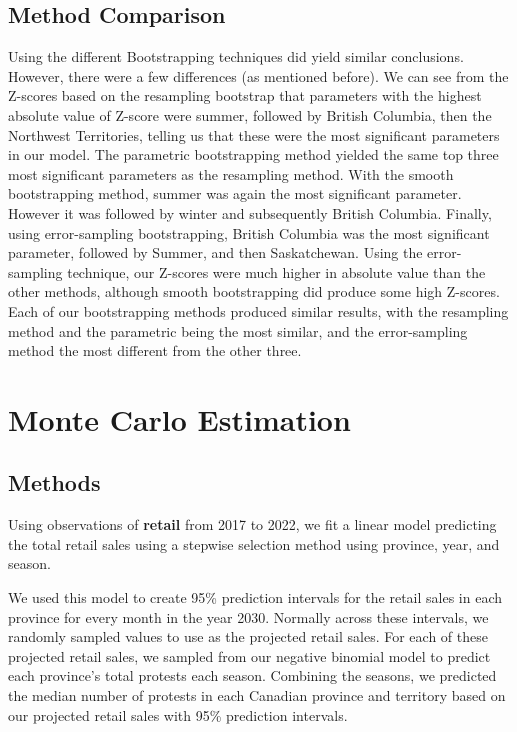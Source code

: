 \documentclass[12pt]{article}
\begin{document}


\subsection{Method Comparison}
Using the different Bootstrapping techniques did yield similar conclusions. However, there were a few differences (as mentioned before). We can see from the Z-scores based on the resampling bootstrap that parameters with the highest absolute value of Z-score were summer, followed by British Columbia, then the Northwest Territories, telling us that these were the most significant parameters in our model. The parametric bootstrapping method yielded the same top three most significant parameters as the resampling method. With the smooth bootstrapping method, summer was again the most significant parameter. However it was followed by winter and subsequently British Columbia. Finally, using error-sampling bootstrapping, British Columbia was the most significant parameter, followed by Summer, and then Saskatchewan. Using the error-sampling technique, our Z-scores were much higher in absolute value than the other methods, although smooth bootstrapping did produce some high Z-scores.
Each of our bootstrapping methods produced similar results, with the resampling method and the parametric being the most similar, and the error-sampling method the most different from the other three.

\newpage
\section{Monte Carlo Estimation}
\subsection*{Methods}
Using observations of \textbf{retail} from 2017 to 2022, we fit a linear model predicting the total retail sales using a stepwise selection method using province, year, and season.

We used this model to create 95\% prediction intervals for the retail sales in each province for every month in the year 2030. Normally across these intervals, we randomly sampled values to use as the projected retail sales. For each of these projected retail sales, we sampled from our negative binomial model to predict each province's total protests each season. Combining the seasons, we predicted the median number of protests in each Canadian province and territory based on our projected retail sales with 95\% prediction intervals.
\end{document}
